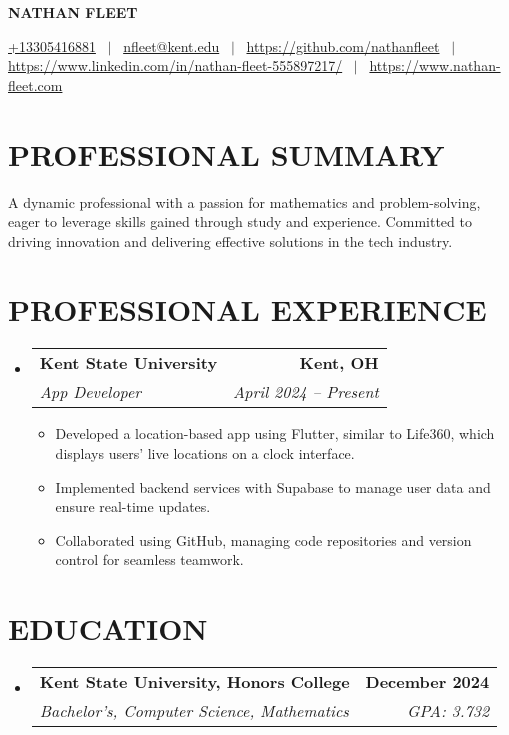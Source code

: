 \documentclass[letterpaper,11pt]{article}
\makeatletter
\newcommand{\resumeItemPlain}[1]{
  \item\small{
    {#1 \vspace{-2pt}}
  }
}
\newcommand{\resumeSubheading}[4]{
  \vspace{-1pt}\item
    \begin{tabular*}{0.97\textwidth}[t]{l@{\extracolsep{\fill}}r}
      \textbf{#1} & \textbf{#2} \\
      \textit{\small#3} & \textit{\small #4} \\
    \end{tabular*}\vspace{-5pt}
}
\newcommand{\resumeItemListStart}{\begin{itemize}[leftmargin=*,label=\textbullet]}
\newcommand{\resumeItemListEnd}{\end{itemize}}
\makeatother
\begin{document}
\begin{center}
  \textbf{\Huge NATHAN FLEET}
\end{center}

\begin{center}
  \href{tel:+13305416881}{+13305416881} \, $\vert$ \,
  \href{mailto:nfleet@kent.edu}{nfleet@kent.edu} \, $\vert$ \,
  \href{https://github.com/yourusername}{https://github.com/nathanfleet} \, $\vert$ \,
  \href{https://linkedin.com/in/yourusername}{https://www.linkedin.com/in/nathan-fleet-555897217/} \, $\vert$ \,
  \href{https://nathan-fleet.com/}{https://www.nathan-fleet.com}
\end{center}

\section{PROFESSIONAL SUMMARY}
  \small{A dynamic professional with a passion for mathematics and problem-solving, eager to leverage skills gained through study and experience. Committed to driving innovation and delivering effective solutions in the tech industry.}

\section{PROFESSIONAL EXPERIENCE}
  \begin{itemize}[leftmargin=0pt,label={}]
    \resumeSubheading
      {Kent State University}{Kent, OH}
      {App Developer}{April 2024 -- Present}
      \resumeItemListStart
        \resumeItemPlain{}
          { Developed a location-based app using Flutter, similar to Life360, which displays users' live locations on a clock interface. }
        \resumeItemPlain{}
          { Implemented backend services with Supabase to manage user data and ensure real-time updates. }
        \resumeItemPlain{}
          { Collaborated using GitHub, managing code repositories and version control for seamless teamwork. }
      \resumeItemListEnd
  \end{itemize}

\section{EDUCATION}
  \begin{itemize}[leftmargin=0pt,label={}]
    \resumeSubheading
      {Kent State University, Honors College}{December 2024}
      {Bachelor's, Computer Science, Mathematics}{GPA: 3.732}
  \end{itemize}
  
\end{document}
